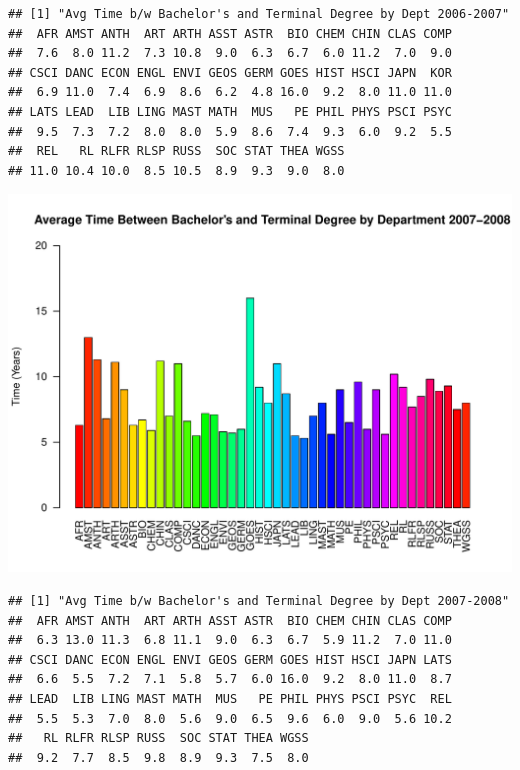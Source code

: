 \documentclass[12pt,a4paper]{article}\usepackage[]{graphicx}\usepackage[]{color}
\makeatletter
\def\maxwidth{ %
  \ifdim\Gin@nat@width>\linewidth
    \linewidth
  \else
    \Gin@nat@width
  \fi
}
\newenvironment{kframe}{%
 \def\at@end@of@kframe{}%
 \ifinner\ifhmode%
  \def\at@end@of@kframe{\end{minipage}}%
  \begin{minipage}{\columnwidth}%
 \fi\fi%
 \def\FrameCommand##1{\hskip\@totalleftmargin \hskip-\fboxsep
 \colorbox{shadecolor}{##1}\hskip-\fboxsep
     \hskip-\linewidth \hskip-\@totalleftmargin \hskip\columnwidth}%
 \MakeFramed {\advance\hsize-\width
   \@totalleftmargin\z@ \linewidth\hsize
   \@setminipage}}%
 {\par\unskip\endMakeFramed%
 \at@end@of@kframe}
\newenvironment{knitrout}{}{} %
\theoremstyle{definition}
\makeatother
\begin{document}
\begin{knitrout}
\begin{kframe}\begin{verbatim}
## [1] "Avg Time b/w Bachelor's and Terminal Degree by Dept 2006-2007"
##  AFR AMST ANTH  ART ARTH ASST ASTR  BIO CHEM CHIN CLAS COMP 
##  7.6  8.0 11.2  7.3 10.8  9.0  6.3  6.7  6.0 11.2  7.0  9.0 
## CSCI DANC ECON ENGL ENVI GEOS GERM GOES HIST HSCI JAPN  KOR 
##  6.9 11.0  7.4  6.9  8.6  6.2  4.8 16.0  9.2  8.0 11.0 11.0 
## LATS LEAD  LIB LING MAST MATH  MUS   PE PHIL PHYS PSCI PSYC 
##  9.5  7.3  7.2  8.0  8.0  5.9  8.6  7.4  9.3  6.0  9.2  5.5 
##  REL   RL RLFR RLSP RUSS  SOC STAT THEA WGSS 
## 11.0 10.4 10.0  8.5 10.5  8.9  9.3  9.0  8.0
\end{verbatim}
\end{kframe}
\includegraphics[width=\maxwidth]{figure/unnamed-chunk-12-4} 
\begin{kframe}\begin{verbatim}
## [1] "Avg Time b/w Bachelor's and Terminal Degree by Dept 2007-2008"
##  AFR AMST ANTH  ART ARTH ASST ASTR  BIO CHEM CHIN CLAS COMP 
##  6.3 13.0 11.3  6.8 11.1  9.0  6.3  6.7  5.9 11.2  7.0 11.0 
## CSCI DANC ECON ENGL ENVI GEOS GERM GOES HIST HSCI JAPN LATS 
##  6.6  5.5  7.2  7.1  5.8  5.7  6.0 16.0  9.2  8.0 11.0  8.7 
## LEAD  LIB LING MAST MATH  MUS   PE PHIL PHYS PSCI PSYC  REL 
##  5.5  5.3  7.0  8.0  5.6  9.0  6.5  9.6  6.0  9.0  5.6 10.2 
##   RL RLFR RLSP RUSS  SOC STAT THEA WGSS 
##  9.2  7.7  8.5  9.8  8.9  9.3  7.5  8.0
\end{verbatim}
\end{kframe}

\end{knitrout}
\end{document}
